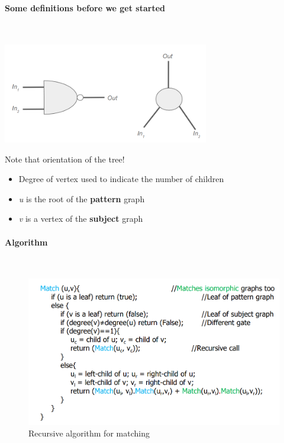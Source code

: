 \documentclass{article}
\begin{document}
\paragraph{Some definitions before we get started}\mbox{}\\
\begin{minipage}[t]{0.5\textwidth}
    \vspace{0pt}
    \includegraphics[width=9cm, scale=1]{S4/graphChildren.PNG}
\end{minipage}%
\begin{minipage}[c]{0.5\textwidth}
    Note that orientation of the tree! \newline

    \begin{itemize}
        \item Degree of vertex used to indicate the number of children
        \item \textit{u} is the root of the \textbf{pattern} graph
        \item \textit{v} is a vertex of the \textbf{subject} graph
    \end{itemize}
\end{minipage}


\paragraph{Algorithm}\mbox{}\\
\begin{figure}[htp]
    \centering
    \includegraphics[width=12cm, scale=1]{S4/matchingAlgorithm.PNG}
    \caption{Recursive algorithm for matching}
\end{figure}
\end{document}

